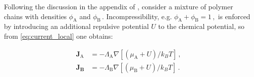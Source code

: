 \documentclass[bachelor,       %
               twoside,        %
               BCOR10mm,       %
               ngerman, english %
               ]{GAUBM}
\begin{document}











Following the discussion in the appendix of \cite{deGennes80}, consider a mixture of polymer chains with densities $\phi_\mathrm A$ and $\phi_\mathrm B\,.$ Incompressibility, e.g. $\phi_\mathrm A+\phi_\mathrm B=1\,,$ is enforced by introducing an additional repulsive potential $U$ to the chemical potential, so from \eqref{eq:current_local} one obtains:



\begin{subequations}
  \begin{align}
    \mathbf{J}_\mathrm A&=-\Lambda_\mathrm A\nabla [(\mu_\mathrm A + U)/k_BT]\,,\\
    \mathbf{J_B}&=-\Lambda_\mathrm B\nabla [(\mu_\mathrm B + U)/k_BT]\,.
  \end{align}
  \label{eq:current_onsager}
\end{subequations}
\end{document}
